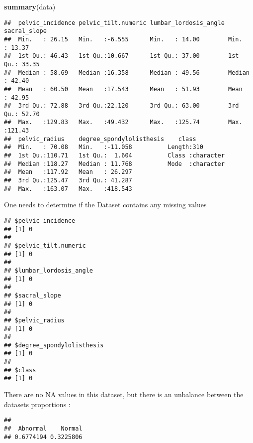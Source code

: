 \documentclass[
]{article}
\newenvironment{Shaded}{\begin{snugshade}}{\end{snugshade}}
\newcommand{\CommentTok}[1]{\textcolor[rgb]{0.56,0.35,0.01}{\textit{#1}}}
\newcommand{\KeywordTok}[1]{\textcolor[rgb]{0.13,0.29,0.53}{\textbf{#1}}}
\newcommand{\NormalTok}[1]{#1}
\newcommand{\OperatorTok}[1]{\textcolor[rgb]{0.81,0.36,0.00}{\textbf{#1}}}
\begin{document}
\begin{Shaded}
\begin{Highlighting}[]
\KeywordTok{summary}\NormalTok{(data)}
\end{Highlighting}
\end{Shaded}

\begin{verbatim}
##  pelvic_incidence pelvic_tilt.numeric lumbar_lordosis_angle  sacral_slope   
##  Min.   : 26.15   Min.   :-6.555      Min.   : 14.00        Min.   : 13.37  
##  1st Qu.: 46.43   1st Qu.:10.667      1st Qu.: 37.00        1st Qu.: 33.35  
##  Median : 58.69   Median :16.358      Median : 49.56        Median : 42.40  
##  Mean   : 60.50   Mean   :17.543      Mean   : 51.93        Mean   : 42.95  
##  3rd Qu.: 72.88   3rd Qu.:22.120      3rd Qu.: 63.00        3rd Qu.: 52.70  
##  Max.   :129.83   Max.   :49.432      Max.   :125.74        Max.   :121.43  
##  pelvic_radius    degree_spondylolisthesis    class          
##  Min.   : 70.08   Min.   :-11.058          Length:310        
##  1st Qu.:110.71   1st Qu.:  1.604          Class :character  
##  Median :118.27   Median : 11.768          Mode  :character  
##  Mean   :117.92   Mean   : 26.297                            
##  3rd Qu.:125.47   3rd Qu.: 41.287                            
##  Max.   :163.07   Max.   :418.543
\end{verbatim}

One needs to determine if the Dataset contains any missing values

\begin{verbatim}
## $pelvic_incidence
## [1] 0
## 
## $pelvic_tilt.numeric
## [1] 0
## 
## $lumbar_lordosis_angle
## [1] 0
## 
## $sacral_slope
## [1] 0
## 
## $pelvic_radius
## [1] 0
## 
## $degree_spondylolisthesis
## [1] 0
## 
## $class
## [1] 0
\end{verbatim}

There are no NA values in this dataset, but there is an unbalance
between the datasets proportions :

\begin{Shaded}
\end{Shaded}

\begin{verbatim}
## 
##  Abnormal    Normal 
## 0.6774194 0.3225806
\end{verbatim}
\end{document}
